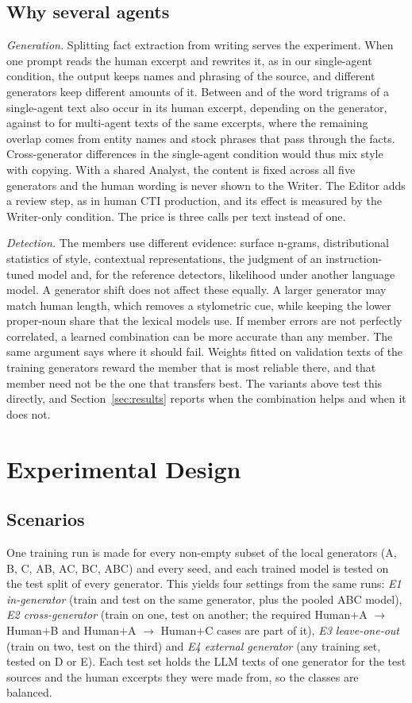 \documentclass[journal]{IEEEtran}
\begin{document}
\subsection{Why several agents}\label{sec:why}
\emph{Generation.} Splitting fact extraction from writing serves the experiment. When one prompt reads the human
excerpt and rewrites it, as in our single-agent condition, the output keeps names and phrasing of the source, and
different generators keep different amounts of it. Between \OverlapSingleMin{} and \OverlapSingleMax{} of the word
trigrams of a single-agent text also occur in its human excerpt, depending on the generator, against
\OverlapMultiMin{} to \OverlapMultiMax{} for multi-agent texts of the same excerpts, where the remaining overlap
comes from entity names and stock phrases that pass through the facts. Cross-generator differences in the
single-agent condition would thus mix style with copying. With a shared Analyst, the content is fixed across all
five generators and the human wording is never shown to the Writer. The Editor adds a review step, as in human CTI
production, and its effect is measured by the Writer-only condition. The price is three calls per text instead of
one.

\emph{Detection.} The members use different evidence: surface n-grams, distributional statistics of style,
contextual representations, the judgment of an instruction-tuned model and, for the reference detectors, likelihood
under another language model. A generator shift does not affect these equally. A larger generator may match human
length, which removes a stylometric cue, while keeping the lower proper-noun share that the lexical models use. If
member errors are not perfectly correlated, a learned combination can be more accurate than any member. The same
argument says where it should fail. Weights fitted on validation texts of the training generators reward the
member that is most reliable there, and that member need not be the one that transfers best. The variants above
test this directly, and Section~\ref{sec:results} reports when the combination helps and when it does not.

\section{Experimental Design}\label{sec:setup}
\subsection{Scenarios}
One training run is made for every non-empty subset of the local generators (A, B, C, AB, AC, BC, ABC) and every
seed, and each trained model is tested on the test split of every generator. This yields four settings from the
same runs: \emph{E1 in-generator} (train and test on the same generator, plus the pooled ABC model), \emph{E2
cross-generator} (train on one, test on another; the required Human+A $\rightarrow$ Human+B and Human+A
$\rightarrow$ Human+C cases are part of it), \emph{E3 leave-one-out} (train on two, test on the third) and \emph{E4
external generator} (any training set, tested on D or E). Each test set holds the LLM texts of one generator for
the test sources and the human excerpts they were made from, so the classes are balanced.
\end{document}
